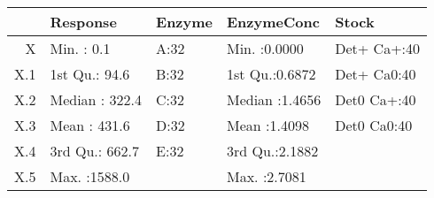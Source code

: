 \begin{table}[ht]
\centering
\begin{tabular}{rllll}
  \hline
 &    Response & Enzyme &   EnzymeConc &      Stock \\ 
  \hline
X & Min.   :   0.1   & A:32   & Min.   :0.0000   & Det+ Ca+:40   \\ 
  X.1 & 1st Qu.:  94.6   & B:32   & 1st Qu.:0.6872   & Det+ Ca0:40   \\ 
  X.2 & Median : 322.4   & C:32   & Median :1.4656   & Det0 Ca+:40   \\ 
  X.3 & Mean   : 431.6   & D:32   & Mean   :1.4098   & Det0 Ca0:40   \\ 
  X.4 & 3rd Qu.: 662.7   & E:32   & 3rd Qu.:2.1882   &  \\ 
  X.5 & Max.   :1588.0   &  & Max.   :2.7081   &  \\ 
   \hline
\end{tabular}
\end{table}
